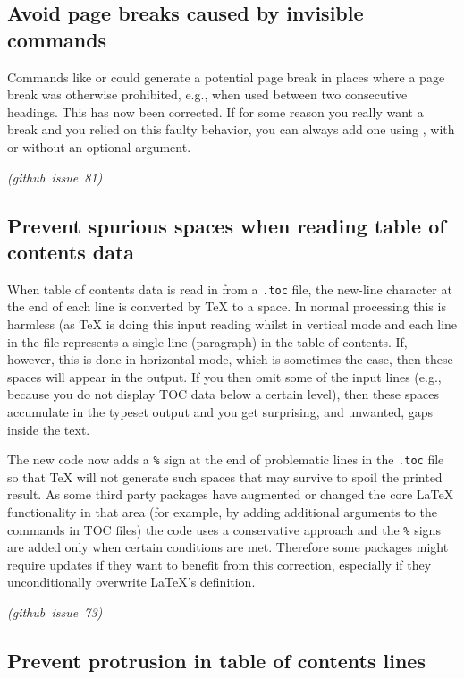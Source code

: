 \documentclass{ltnews}
\newcommand\githubissue[2][]{\ifhmode\unskip\fi
     \quad\penalty500\strut\nobreak\hfill
     \mbox{\small\itshape(github issue#1 #2)}\par}
\begin{document}
\subsection{Avoid page breaks caused by invisible commands}

Commands like  or  could generate a potential page
break in places where a page break was otherwise prohibited, e.g.,
when used between two consecutive headings. This has now been
corrected. If for some reason you really want a break and you relied
on this faulty behavior, you can always add one using ,
with or without an optional argument.
%
\githubissue{81}



\subsection{Prevent spurious spaces when reading table of contents data}

When table of contents data is read in from a \texttt{.toc} file, the
new-line character at the end of each line is converted by \TeX{} to a
space. In normal processing this is harmless (as \TeX{} is doing this
input reading whilst in vertical mode and each line in the file
represents a single line (paragraph) in the table of contents. If,
however, this is done in horizontal mode, which is sometimes the case,
then these spaces will appear in the output. If you then omit some of
the input lines (e.g., because you do not display TOC data below a
certain level), then these spaces accumulate in the typeset output and
you get surprising, and unwanted, gaps inside the text.

The new code now adds a \texttt{\%} sign at the end of problematic
lines in the \texttt{.toc} file so that \TeX{} will not generate such
spaces that may survive to spoil the printed result. As some third
party packages have augmented or changed the core \LaTeX{}
functionality in that area (for example, by adding additional
arguments to the commands in TOC files) the code uses a conservative
approach and the \texttt{\%} signs are added only when certain
conditions are met.  Therefore some packages might require updates if
they want to benefit from this correction, especially if they
unconditionally overwrite \LaTeX{}'s  definition.
%
\githubissue{73}


\subsection{Prevent protrusion in table of contents lines}
\end{document}
